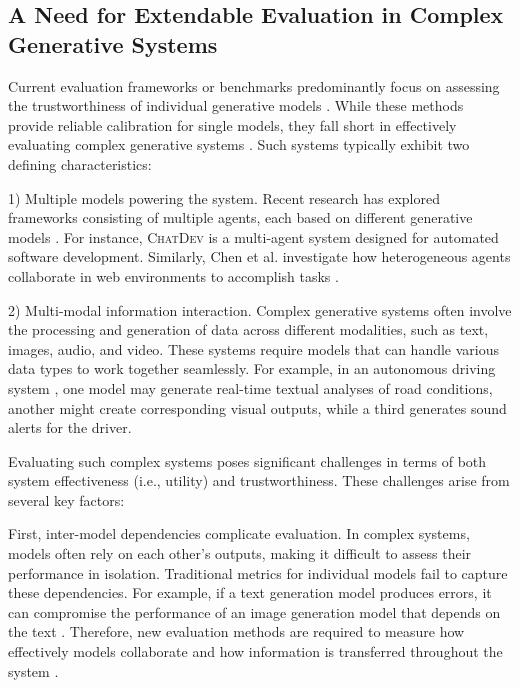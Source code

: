 \subsection{A Need for Extendable Evaluation in Complex Generative Systems}

Current evaluation frameworks or benchmarks predominantly focus on assessing the trustworthiness of individual generative models \cite{wang2023decodingtrust, huang2024position}. While these methods provide reliable calibration for single models, they fall short in effectively evaluating complex generative systems \cite{reuel2024open}. Such systems typically exhibit two defining characteristics:

1) Multiple models powering the system. Recent research has explored frameworks consisting of multiple agents, each based on different generative models \cite{guo2024large, williams2023epidemic, gao2023s, wang2023avalon, chen2024agentverse, chatdev, yang2024matplotagent,ouyang2025nvagent,gui2025uicopilot}. For instance, \textsc{ChatDev} \cite{chatdev} is a multi-agent system designed for automated software development. Similarly, Chen et al. investigate how heterogeneous agents collaborate in web environments to accomplish tasks \cite{chen2024internet}.

2) Multi-modal information interaction. Complex generative systems often involve the processing and generation of data across different modalities, such as text, images, audio, and video. These systems require models that can handle various data types to work together seamlessly. For example, in an autonomous driving system \cite{zheng2024genad, fu2024gendds, hu2023gaia, Sural2024ContextVLMZA}, one model may generate real-time textual analyses of road conditions, another might create corresponding visual outputs, while a third generates sound alerts for the driver.

Evaluating such complex systems poses significant challenges in terms of both system effectiveness (i.e., utility) and trustworthiness. These challenges arise from several key factors:

First, inter-model dependencies complicate evaluation. In complex systems, models often rely on each other's outputs, making it difficult to assess their performance in isolation. Traditional metrics for individual models fail to capture these dependencies. For example, if a text generation model produces errors, it can compromise the performance of an image generation model that depends on the text \cite{gu2024agent, ju2024flooding}. Therefore, new evaluation methods are required to measure how effectively models collaborate and how information is transferred throughout the system \cite{chen2024agentverse}.

